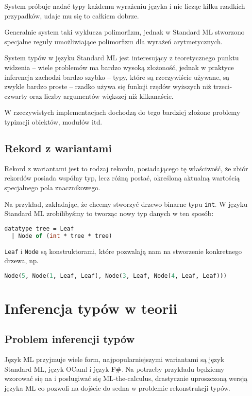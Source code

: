 \documentclass{article}
\begin{document}
System próbuje nadać typy każdemu wyrażeniu języka i nie licząc kilku rzadkich przypadków, udaje mu się to całkiem dobrze.

Generalnie system taki wyklucza polimorfizm, jednak w Standard ML stworzono specjalne reguły umożliwiające polimorfizm dla wyrażeń arytmetycznych.

System typów w języku Standard ML jest interesujący z teoretycznego punktu widzenia – wiele problemów ma bardzo wysoką złożoność, jednak w praktyce inferencja zachodzi bardzo szybko – typy, które są rzeczywiście używane, są zwykle bardzo proste – rzadko używa się funkcji rzędów wyższych niż trzeci-czwarty oraz liczby argumentów większej niż kilkanaście.

W rzeczywistych implementacjach dochodzą do tego bardziej złożone problemy typizacji obiektów, modułów itd.

\subsection{Rekord z wariantami} Rekord z wariantami jest to rodzaj rekordu, posiadającego tę właściwość, że zbiór rekordów posiada wspólny typ, lecz różną postać, określoną aktualną wartością specjalnego pola znacznikowego.

Na przykład, zakładając, że chcemy stworzyć drzewo binarne typu \lstinline$int$. W języku Standard ML zrobilibyśmy to tworząc nowy typ danych w ten sposób:
\begin{lstlisting}[language=ML]
datatype tree = Leaf
  | Node of (int * tree * tree)
\end{lstlisting}
\lstinline{Leaf} i \lstinline{Node} są konstruktorami, które pozwalają nam na stworzenie konkretnego drzewa, np.
\begin{lstlisting}[language=ML]
  Node(5, Node(1, Leaf, Leaf), Node(3, Leaf, Node(4, Leaf, Leaf)))
\end{lstlisting}
\section{Inferencja typów w teorii}
\subsection{Problem inferencji typów}
Język ML przyjmuje wiele form, najpopularniejszymi wariantami są język Standard ML, język OCaml
i język F\#. Na potrzeby przykładu będziemy wzorować się na \cite{Damas__Milner__1982} i posługiwać się ML-the-calculus, drastycznie uproszczoną wersją języka ML co pozwoli na dojście do sedna w problemie rekonstrukcji typów.
\end{document}
